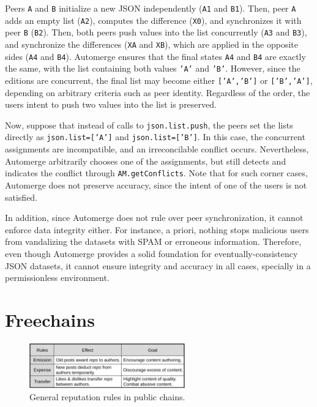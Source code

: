 \documentclass[12pt]{article}
\newcommand{\code}[1]  {\texttt{\footnotesize{#1}}}
\begin{document}
Peers \code{A} and \code{B} initialize a new JSON independently (\code{A1} and
\code{B1}).
Then, peer \code{A} adds an empty list (\code{A2}), computes the difference
(\code{X0}), and synchronizes it with peer \code{B} (\code{B2}).
Then, both peers push values into the list concurrently (\code{A3} and
\code{B3}), and synchronize the differences (\code{XA} and \code{XB}), which
are applied in the opposite sides (\code{A4} and \code{B4}).
Automerge ensures that the final states \code{A4} and \code{B4} are exactly the
same, with the list containing both values \code{'A'} and \code{'B'}.
However, since the editions are concurrent, the final list may become either
\code{['A','B']} or \code{['B','A']}, depending on arbitrary criteria such as
peer identity.
Regardless of the order, the users intent to push two values into the list is
preserved.

Now, suppose that instead of calls to \code{json.list.push}, the peers set the
lists directly as \code{json.list=['A']} and \code{json.list=['B']}.
In this case, the concurrent assignments are incompatible, and an
irreconcilable conflict occurs.
Nevertheless, Automerge arbitrarily chooses one of the assignments, but still
detects and indicates the conflict through \code{AM.getConflicts}.
Note that for such corner cases, Automerge does not preserve accuracy, since
the intent of one of the users is not satisfied.

In addition, since Automerge does not rule over peer synchronization, it cannot
enforce data integrity either.
For instance, a priori, nothing stops malicious users from vandalizing the
datasets with SPAM or erroneous information.
%
Therefore, even though Automerge provides a solid foundation for
eventually-consistency JSON datasets, it cannot ensure integrity and accuracy
in all cases, specially in a permissionless environment.

\section{Freechains}
\label{sec.freechains}

\begin{figure}
    \includegraphics[width=0.6\textwidth]{general.png}
    \caption{General reputation rules in public chains.}
    \label{fig.general}
\end{figure}
\end{document}
